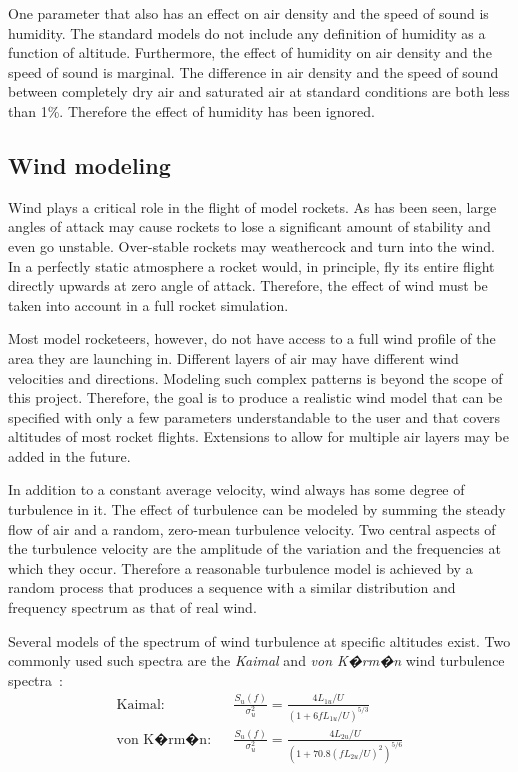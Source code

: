 One parameter that also has an effect on air density and the speed of
sound is humidity.  The standard models do not include any definition
of humidity as a function of altitude.  Furthermore, the effect of
humidity on air density and the speed of sound is marginal.  The
difference in air density and the speed of sound between completely dry
air and saturated air at standard conditions are both less than 1\%.
Therefore the effect of humidity has been ignored.




\subsection{Wind modeling}

Wind plays a critical role in the flight of model rockets.  As has
been seen, large angles of attack may cause rockets to lose a
significant amount of stability and even go unstable.  Over-stable
rockets may weathercock and turn into the wind.  In a perfectly static
atmosphere a rocket would, in principle, fly its entire flight
directly upwards at zero angle of attack.  Therefore, the effect of
wind must be taken into account in a full rocket simulation.

Most model rocketeers, however, do not have access to a full wind
profile of the area they are launching in.  Different layers of air
may have different wind velocities and directions.  Modeling such
complex patterns is beyond the scope of this project. Therefore, the
goal is to produce a realistic wind model that can be specified with
only a few parameters understandable to the user and that covers
altitudes of most rocket flights.  Extensions to allow for multiple
air layers may be added in the future.

In addition to a constant average velocity, wind always has some
degree of turbulence in it.  The effect of turbulence can be modeled
by summing the steady flow of air and a random, zero-mean turbulence
velocity.  Two central aspects of the turbulence velocity are the
amplitude of the variation and the frequencies at which they occur.
Therefore a reasonable turbulence model is achieved by a random
process that produces a sequence with a similar distribution and
frequency spectrum as that of real wind.

Several models of the spectrum of wind turbulence at specific
altitudes exist.  Two commonly used such spectra are the {\it Kaimal}
and {\it von K�rm�n} wind turbulence
spectra~\cite[p.~23]{wind-energy-handbook}:
%
\begin{eqnarray}
\mbox{Kaimal:} & & \frac{S_u(f)}{\sigma_u^2} =
    \frac{4 L_{1u} / U}{(1 + 6fL_{1u}/U)^{5/3}} \label{eq-kaimal-wind} \\
%
\mbox{von K�rm�n:} & & \frac{S_u(f)}{\sigma_u^2} =
    \frac{4 L_{2u} / U}{(1 + 70.8(fL_{2u}/U)^2)^{5/6}} \label{eq-karman-wind}
\end{eqnarray}

